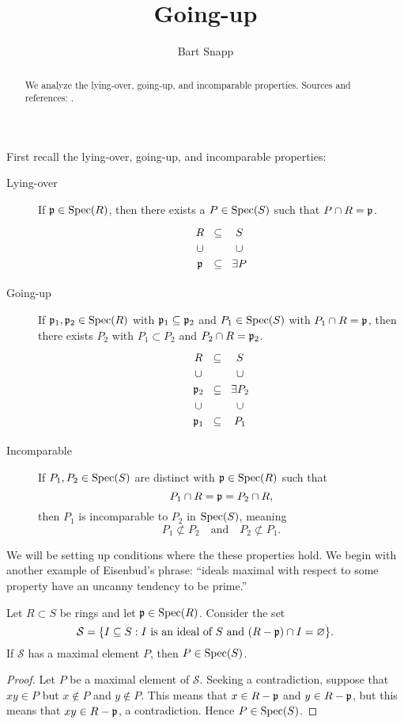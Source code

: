 \documentclass{ximera}
\author{Bart Snapp}
\title{Going-up}
\begin{document}
\begin{abstract}
  We analyze the lying-over, going-up, and incomparable properties. Sources and references:
  \cite{iK1974}.
\end{abstract}
\maketitle


First recall the lying-over, going-up, and incomparable properties:
\begin{description}
\item[Lying-over] If $\mathfrak{p}\in\operatorname{Spec}(R)$, then there exists a
  $P\in\operatorname{Spec}(S)$ such that $P\cap R = \mathfrak{p}$.
  \[
  \begin{tikzcd}[row sep=0em,column sep=0em]
    R    & \subset & S \\
    \cup &         & \cup \\
    \p   & \subset & \exists P
  \end{tikzcd}
  \]
\item[Going-up] If $\mathfrak{p}_1,\mathfrak{p}_2\in\operatorname{Spec}(R)$ with $\mathfrak{p}_1\subseteq\mathfrak{p}_2$ and
  $P_1\in\operatorname{Spec}(S)$ with $P_1\cap R= \mathfrak{p}$, then there exists $P_2$ with
  $P_1\subset P_2$ and $P_2\cap R = \mathfrak{p}_2$.
  \[
  \begin{tikzcd}[row sep=0em,column sep=0em]
    R    & \subset & S \\
    \cup &         & \cup \\
    \p_2 & \subset & \exists P_2 \\
    \cup &         & \cup \\
    \p_1 & \subset & P_1  
  \end{tikzcd}
  \]
\item[Incomparable] If $P_1,P_2\in\operatorname{Spec}(S)$ are
  distinct with $\mathfrak{p}\in\operatorname{Spec}(R)$ such that
  \[
  P_1\cap R= \mathfrak{p}= P_2\cap R,
  \]
  then $P_1$ is incomparable to $P_2$ in $\operatorname{Spec}(S)$, meaning
  \[
  P_1\not\subset P_2\quad\text{and}\quad P_2\not\subset P_1.
  \]
\end{description}
We will be setting up conditions where the these properties hold.  We
begin with another example of Eisenbud's phrase: ``ideals maximal with
respect to some property have an uncanny tendency to be prime.''


\begin{proposition}
  Let $R\subset S$ be rings and let $\mathfrak{p}\in\operatorname{Spec}(R)$. Consider the set
  \[
  \mathcal{S} = \{I\subseteq S: \text{$I$ is an ideal of $S$ and $(R-\mathfrak{p})\cap I = \varnothing$}\}.
  \]
  If $\mathcal{S}$ has a maximal element $P$, then $P\in\operatorname{Spec}(S)$.
  \begin{proof}
    Let $P$ be a maximal element of $\mathcal{S}$. Seeking a
    contradiction, suppose that $xy\in P$ but $x\notin P$ and $y\notin
    P$. This means that $x\in R-\mathfrak{p}$ and $y\in R-\mathfrak{p}$, but this means
    that $xy\in R-\mathfrak{p}$, a contradiction. Hence $P\in\operatorname{Spec}(S)$.
  \end{proof}
\end{proposition}
\end{document}
